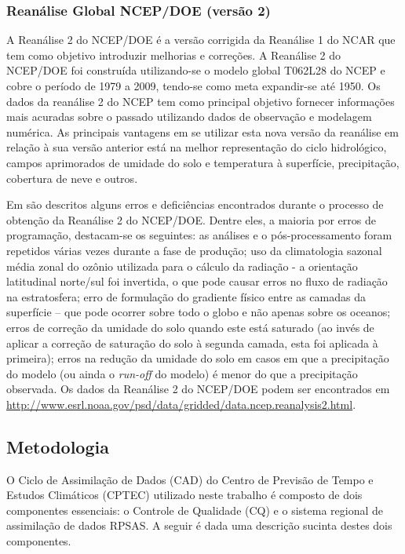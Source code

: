 \subsubsection{Reanálise Global NCEP/DOE (versão 2)}

A Reanálise 2 do NCEP/DOE \cite{kanamitsuetal02} é a versão corrigida da Reanálise 1 do NCAR \cite{kalnayetal96} que tem como objetivo introduzir melhorias e correções. A Reanálise 2 do NCEP/DOE foi construída utilizando-se o modelo global T062L28 do NCEP e cobre o período de 1979 a 2009, tendo-se como meta expandir-se até 1950. Os dados da reanálise 2 do NCEP tem como principal objetivo fornecer informações mais acuradas sobre o passado utilizando dados de observação e modelagem numérica. As principais vantagens em se utilizar esta nova versão da reanálise em relação à sua versão anterior está na melhor representação do ciclo hidrológico, campos aprimorados de umidade do solo e temperatura à superfície, precipitação, cobertura de neve e outros.

Em  são descritos alguns erros e deficiências encontrados durante o processo de obtenção da Reanálise 2 do NCEP/DOE. Dentre eles, a maioria por erros de programação, destacam-se os seguintes: as análises e o pós-processamento foram repetidos várias vezes durante a fase de produção; uso da climatologia sazonal média zonal do ozônio utilizada para o cálculo da radiação - a orientação latitudinal norte/sul foi invertida, o que pode causar erros no fluxo de radiação na estratosfera; erro de formulação do gradiente físico entre as camadas da superfície – que pode ocorrer sobre todo o globo e não apenas sobre os oceanos; erros de correção da umidade do solo quando este está saturado (ao invés de aplicar a correção de saturação do solo à segunda camada, esta foi aplicada à primeira); erros na redução da umidade do solo em casos em que a precipitação do modelo (ou ainda o \textit{run-off} do modelo) é menor do que a precipitação observada. Os dados da Reanálise 2 do NCEP/DOE podem ser encontrados em \url{http://www.esrl.noaa.gov/psd/data/gridded/data.ncep.reanalysis2.html}.

\subsection{Metodologia}

O Ciclo de Assimilação de Dados (CAD) do Centro de Previsão de Tempo e Estudos Climáticos (CPTEC) utilizado neste trabalho é composto de dois  componentes essenciais: o Controle de Qualidade (CQ) e o sistema regional de assimilação de dados RPSAS. A seguir é dada uma descrição sucinta destes dois componentes.

